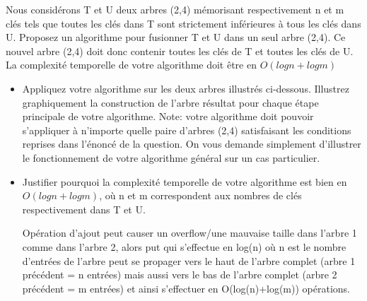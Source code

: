 Nous considérons T et U deux arbres (2,4) mémorisant respectivement n et m clés tels que toutes les clés dans T sont strictement inférieures à tous les clés dans U. Proposez un algorithme pour fusionner T et U dans un seul arbre (2,4). Ce nouvel arbre (2,4) doit donc contenir toutes les clés de T et toutes les clés de U. La complexité temporelle de votre algorithme doit être en $O(log n + log m)$

 \begin{itemize}

	\item Appliquez votre algorithme sur les deux arbres illustrés ci-dessous. Illustrez graphiquement la construction de l'arbre résultat pour chaque étape principale de votre algorithme. Note: votre algorithme doit pouvoir s'appliquer à n'importe quelle paire d'arbres (2,4) satisfaisant les conditions reprises dans l'énoncé de la question. On vous demande simplement d'illustrer le fonctionnement de votre algorithme général sur un cas particulier.
	
	\item Justifier pourquoi la complexité temporelle de votre algorithme est bien en $O(log n + log m)$, où n et m correspondent aux nombres de clés respectivement dans T et U.
	
	Opération d'ajout peut causer un overflow/une mauvaise taille dans l'arbre 1 comme dans l'arbre 2, alors put qui s'effectue en log(n) où n est le nombre d'entrées de l'arbre peut se propager vers le haut de l'arbre complet (arbre 1 précédent = n entrées) mais aussi vers le bas de l'arbre complet (arbre 2 précédent = m entrées) et ainsi s'effectuer en O(log(n)+log(m)) opérations.
	
 \end{itemize}

